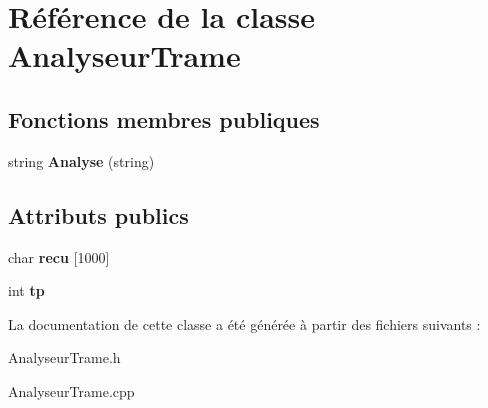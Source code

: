 \hypertarget{class_analyseur_trame}{\section{Référence de la classe Analyseur\-Trame}
\label{class_analyseur_trame}
}
\subsection*{Fonctions membres publiques}
\begin{DoxyCompactItemize}
\item 
\hypertarget{class_analyseur_trame_a44c4888e43a39bf8295eda4872070948}{string {\bfseries Analyse} (string)}\label{class_analyseur_trame_a44c4888e43a39bf8295eda4872070948}

\end{DoxyCompactItemize}
\subsection*{Attributs publics}
\begin{DoxyCompactItemize}
\item 
\hypertarget{class_analyseur_trame_a13079899ad6b9c2af3835ffd71f71e08}{char {\bfseries recu} \mbox{[}1000\mbox{]}}\label{class_analyseur_trame_a13079899ad6b9c2af3835ffd71f71e08}

\item 
\hypertarget{class_analyseur_trame_a92ecc1f6adb0d26bf21e7e6575107a74}{int {\bfseries tp}}\label{class_analyseur_trame_a92ecc1f6adb0d26bf21e7e6575107a74}

\end{DoxyCompactItemize}


La documentation de cette classe a été générée à partir des fichiers suivants \-:\begin{DoxyCompactItemize}
\item 
Analyseur\-Trame.\-h\item 
Analyseur\-Trame.\-cpp\end{DoxyCompactItemize}
